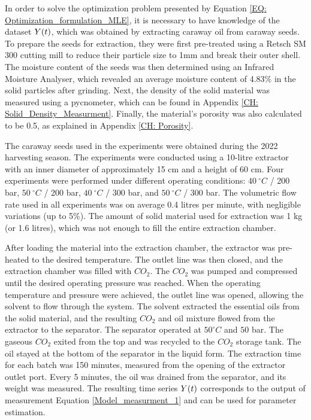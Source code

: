 \documentclass[../Article_Model_Parameters.tex]{subfiles}
\begin{document}
	
	\label{CH: Experiments}
	
	In order to solve the optimization problem presented by Equation \ref{EQ: Optimization_formulation_MLE}, it is necessary to have knowledge of the dataset ${\color{black}Y}(t)$, which was obtained by extracting caraway oil from caraway seeds. To prepare the seeds for extraction, they were first pre-treated using a Retsch SM 300 cutting mill to reduce their particle size to 1mm and break their outer shell. The moisture content of the seeds was then determined using an Infrared Moisture Analyser, which revealed an average moisture content of 4.83\% in the solid particles after grinding. Next, the density of the solid material was measured using a pycnometer, which can be found in Appendix \ref{CH: Solid_Density_Measurment}. Finally, the material's porosity was also calculated to be 0.5, as explained in Appendix \ref{CH: Porosity}.
	
	The caraway seeds used in the experiments were obtained during the 2022 harvesting season. The experiments were conducted using a 10-litre extractor with an inner diameter of approximately 15 cm and a height of 60 cm. Four experiments were performed under different operating conditions: $40~^\circ C$ / 200 bar, $50~^\circ C$ / 200 bar, $40~^\circ C$ / 300 bar, and $50~^\circ C$ / 300 bar. The volumetric flow rate used in all experiments was on average 0.4 litres per minute, with negligible variations (up to 5\%). The amount of solid material used for extraction was 1 kg (or 1.6 litres), which was not enough to fill the entire extraction chamber.
	
	After loading the material into the extraction chamber, the extractor was pre-heated to the desired temperature. The outlet line was then closed, and the extraction chamber was filled with $CO_2$. The $CO_2$ was pumped and compressed until the desired operating pressure was reached. When the operating temperature and pressure were achieved, the outlet line was opened, allowing the solvent to flow through the system. The solvent extracted the essential oils from the solid material, and the resulting $CO_2$ and oil mixture flowed from the extractor to the separator. The separator operated at $50^\circ C$ and $50$ bar. The gaseous $CO_2$ exited from the top and was recycled to the $CO_2$ storage tank. The oil stayed at the bottom of the separator in the liquid form. The extraction time for each batch was 150 minutes, measured from the opening of the extractor outlet port. Every 5 minutes, the oil was drained from the separator, and its weight was measured. The resulting time series ${\color{black}Y}(t)$ corresponds to the output of measurement Equation \ref{Model_measurment_1} and can be used for parameter estimation.
	

	
\end{document}
